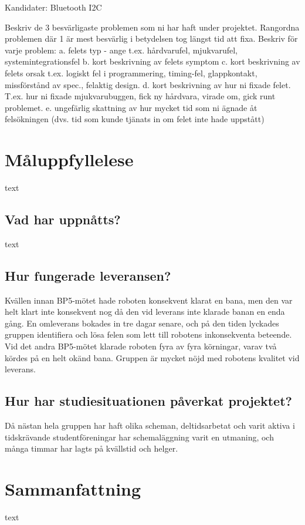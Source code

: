 \documentclass{article}
\begin{document}
Kandidater:
Bluetooth
I2C

Beskriv de 3 besvärligaste problemen som ni har haft under projektet. 
Rangordna problemen där 1 är mest besvärlig i betydelsen tog längst tid att fixa.
Beskriv för varje problem:
a. felets typ - ange t.ex.  hårdvarufel, mjukvarufel, systemintegrationsfel 
b. kort beskrivning av felets symptom 
c. kort beskrivning av felets orsak t.ex. logiskt fel i programmering, timing-fel, glappkontakt, missförstånd av spec., felaktig design. 
d. kort beskrivning av hur ni fixade felet. T.ex. hur ni fixade mjukvarubuggen, fick ny hårdvara, virade om, gick runt problemet.
e. ungefärlig skattning av hur mycket tid som ni ägnade åt felsökningen (dvs. tid som kunde tjänats in om felet inte hade uppstått)


\clearpage
\section{Måluppfyllelese}
text

\subsection{Vad har uppnåtts?}
text

\subsection{Hur fungerade leveransen?}
Kvällen innan BP5-mötet hade roboten konsekvent klarat en bana, men den var helt klart inte konsekvent nog då den vid leverans inte klarade banan en enda gång. En omleverans bokades in tre dagar senare, och på den tiden lyckades gruppen identifiera och lösa felen som lett till robotens inkonsekventa beteende. Vid det andra BP5-mötet klarade roboten fyra av fyra körningar, varav två kördes på en helt okänd bana. Gruppen är mycket nöjd med robotens kvalitet vid leverans.

\subsection{Hur har studiesituationen påverkat projektet?}
Då nästan hela gruppen har haft olika scheman, deltidsarbetat och varit aktiva i tidskrävande studentföreningar har schemaläggning varit en utmaning, och många timmar har lagts på kvällstid och helger. 

\clearpage
\section{Sammanfattning}
text
\end{document}
